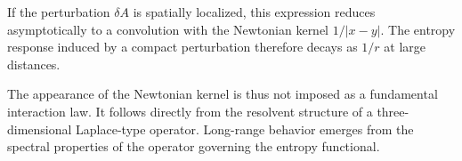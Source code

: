    If the perturbation $\delta A$ is spatially localized,
    this expression reduces asymptotically to a convolution
    with the Newtonian kernel $1/|x-y|$.
    The entropy response induced by a compact perturbation
    therefore decays as $1/r$ at large distances.

    The appearance of the Newtonian kernel is thus not imposed
    as a fundamental interaction law.
    It follows directly from the resolvent structure of a
    three-dimensional Laplace-type operator.
    Long-range behavior emerges from the spectral properties
    of the operator governing the entropy functional.
